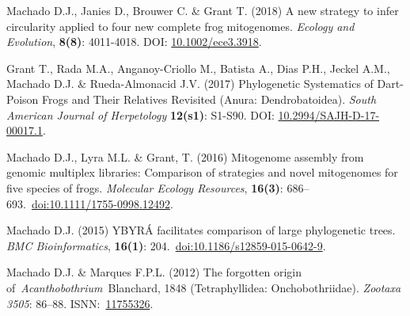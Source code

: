 {\begin{hangparas}{.25in}{1}
		Machado D.J., Janies D., Brouwer C. \& Grant T. (2018) A new strategy to infer circularity applied to four new complete frog mitogenomes. \emph{Ecology and Evolution}, \textbf{8(8)}: 4011-4018. DOI: \href{http://doi.wiley.com/10.1002/ece3.3918}{10.1002/ece3.3918}.

		Grant T., Rada M.A., Anganoy-Criollo M., Batista A., Dias P.H., Jeckel A.M., Machado D.J. \& Rueda-Almonacid J.V. (2017) Phylogenetic Systematics of Dart-Poison Frogs and Their Relatives Revisited (Anura: Dendrobatoidea). \emph{South American Journal of Herpetology} \textbf{12(s1)}: S1-S90. DOI: \href{http://www.bioone.org/doi/10.2994/SAJH-D-17-00017.1}{10.2994/SAJH-D-17-00017.1}.

		Machado D.J., Lyra M.L. \& Grant, T. (2016) Mitogenome assembly from genomic multiplex libraries: Comparison of strategies and novel mitogenomes for five species of frogs. \emph{Molecular Ecology Resources}, \textbf{16(3)}: 686--693.~\href{https://doi.org/10.1111/1755-0998.12492}{doi:10.1111/1755-0998.12492}.

		Machado D.J. (2015) YBYRÁ facilitates comparison of large phylogenetic trees. \emph{BMC Bioinformatics}, \textbf{16(1)}: 204.~\href{https://doi.org/10.1186/s12859-015-0642-9}{doi:10.1186/s12859-015-0642-9}.

		Machado D.J. \& Marques F.P.L. (2012) The forgotten origin of~\emph{Acanthobothrium}~Blanchard, 1848 (Tetraphyllidea: Onchobothriidae). \emph{Zootaxa} \emph{3505}: 86--88. ISNN:~\href{http://www.mapress.com/zootaxa/2012/f/z03505p088f.pdf}{11755326}.

		\end{hangparas}
	}


		
